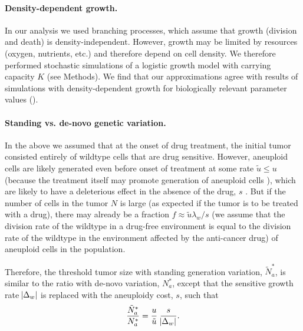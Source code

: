 \documentclass[12pt]{extarticle}
\begin{document}
\paragraph*{Density-dependent growth.}

In our analysis we used branching processes, which assume that growth (division and death) is density-independent. However, growth may be limited by resources (oxygen, nutrients, etc.) and therefore depend on cell density. 
We therefore performed stochastic simulations of a logistic growth model with carrying capacity $K$ (see Methods). 
We find that our approximations agree with results of simulations with density-dependent growth for biologically relevant parameter values ().

\paragraph*{Standing vs. de-novo genetic variation.}

In the above we assumed that at the onset of drug treatment, the initial tumor consisted entirely of wildtype cells that are drug sensitive.
However, aneuploid cells are likely generated even before onset of treatment at some rate $\tilde{u} \le u$ (because the treatment itself may promote generation of aneuploid cells \citep{wang2019molecular,mason2017functional}), which are likely to have a deleterious effect in the absence of the drug, $s$ \citep{replogle2020aneuploidy,giam2015aneuploidy}. %
But if the number of cells in the tumor $N$ is large (as expected if the tumor is to be treated with a drug), there may already be a fraction $f \approx \tilde{u}\lambda_w/s$ (we assume that the division rate of the wildtype in a drug-free environment is equal to the division rate of the wildtype in the environment affected by the anti-cancer drug) of aneuploid cells in the population.

Therefore, the threshold tumor size with standing generation variation, $\tilde{N}^*_{a}$, is similar to the ratio with de-novo variation, $N^*_a$, except that the sensitive growth rate $\abs{\Delta_w}$ is replaced with the aneuploidy cost, $s$, such that 
\begin{equation}
\frac{\tilde{N}^*_{a}}{N^*_{a}} = \frac{u}{\tilde{u}} \; \frac{s}{\abs{\Delta_w}}.
\end{equation}
\end{document}
